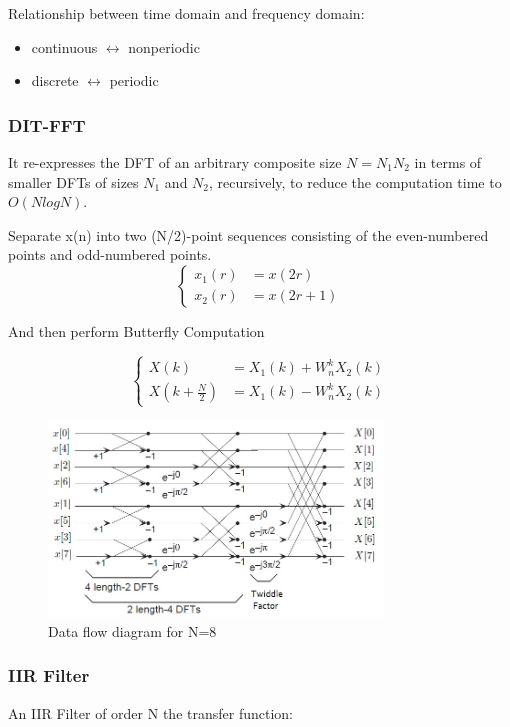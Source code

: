 Relationship between time domain and frequency domain:
\begin{itemize}
  \item continuous $\leftrightarrow$ nonperiodic
  \item discrete $\leftrightarrow$ periodic
\end{itemize}

\subsubsection{DIT-FFT}
It re-expresses the DFT of an arbitrary composite size $N = N_1N_2$ in terms of smaller DFTs of sizes $N_1$ and $N_2$, recursively, to reduce the computation time to $O(N log N)$.

Separate x(n) into two (N/2)-point sequences consisting of the even-numbered points and odd-numbered points.
$$
\left\{
    \begin{aligned}
      x_1(r) &= x(2r) \\
      x_2(r) &= x(2r+1)
    \end{aligned}
\right.
$$

And then perform Butterfly Computation

$$
\left\{
    \begin{aligned}
      X(k) &= X_1(k)+W_n^kX_2(k) \\
      X(k+\frac{N}{2}) &= X_1(k)-W_n^kX_2(k)
    \end{aligned}
\right.
$$

\begin{figure}
  \centering
  \includegraphics[width=3.5in]{fig/FFt.jpg}
  \caption{Data flow diagram for N=8}\label{fig_fft}
\end{figure}

\subsubsection{IIR Filter}

An IIR Filter of order N the transfer function:

